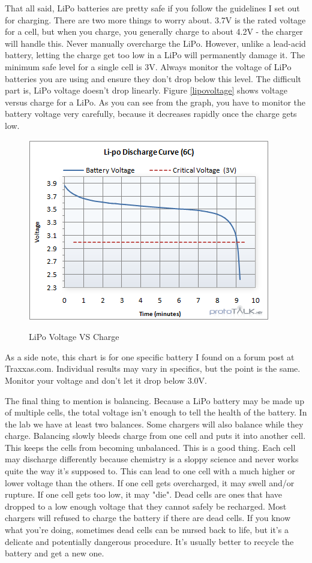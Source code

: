 That all said, LiPo batteries are pretty safe if you follow the guidelines I set out for charging. There are two more things to worry about. 3.7V is the rated voltage for a cell, but when you charge, you generally charge to about 4.2V - the charger will handle this. Never manually overcharge the LiPo. However, unlike a lead-acid battery, letting the charge get too low in a LiPo will permanently damage it. The minimum safe level for a single cell is 3V. Always monitor the voltage of LiPo batteries you are using and ensure they don't drop below this level. The difficult part is, LiPo voltage doesn't drop linearly. Figure \ref{lipovoltage} shows voltage versus charge for a LiPo. As you can see from the graph, you have to monitor the battery voltage very carefully, because it decreases rapidly once the charge gets low.

\begin{figure}[h]
\centering
\includegraphics[scale=0.75]{lipovoltage.png}
\label{fig:lipovoltage}
\caption{LiPo Voltage VS Charge}
\end{figure}

As a side note, this chart is for one specific battery I found on a forum post at Traxxas.com. Individual results may vary in specifics, but the point is the same. Monitor your voltage and don't let it drop below 3.0V.

The final thing to mention is balancing. Because a LiPo battery may be made up of multiple cells, the total voltage isn't enough to tell the health of the battery. In the lab we have at least two balances. Some chargers will also balance while they charge. Balancing slowly bleeds charge from one cell and puts it into another cell. This keeps the cells from becoming unbalanced. This is a good thing. Each cell may discharge differently because chemistry is a sloppy science and never works quite the way it's supposed to. This can lead to one cell with a much higher or lower voltage than the others. If one cell gets overcharged, it may swell and/or rupture. If one cell gets too low, it may "die". Dead cells are ones that have dropped to a low enough voltage that they cannot safely be recharged. Most chargers will refused to charge the battery if there are dead cells. If you know what you're doing, sometimes dead cells can be nursed back to life, but it's a delicate and potentially dangerous procedure. It's usually better to recycle the battery and get a new one.

